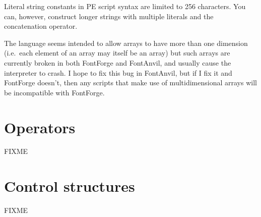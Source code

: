 \begin{framed}
Literal string constants in PE script syntax are limited to 256 characters. 
You can, however, construct longer strings with multiple literals and the
concatenation operator.
\end{framed}

\begin{framed}
The language seems intended to allow arrays to have more than one dimension
(i.e.\ each element of an array may itself be an array) but such arrays are
currently broken in both FontForge and FontAnvil, and usually cause the
interpreter to crash.  I hope to fix this bug in FontAnvil, but if I fix it
and FontForge doesn't, then any scripts that make use of multidimensional
arrays will be incompatible with FontForge.
\end{framed}

\section{Operators}

FIXME

\section{Control structures}

FIXME
